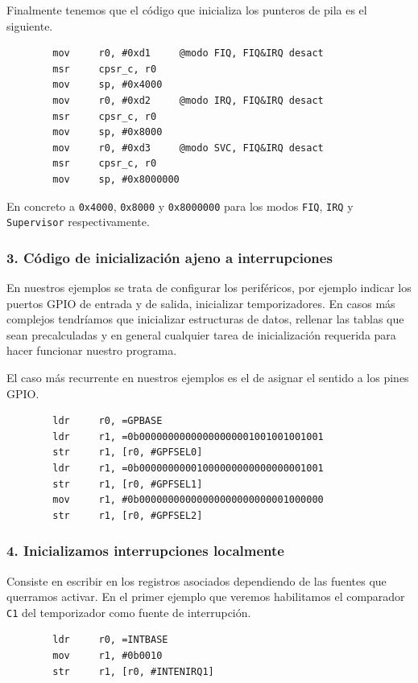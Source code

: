Finalmente tenemos que el código que inicializa los punteros de pila es el siguiente.

\begin{lstlisting}
        mov     r0, #0xd1     @modo FIQ, FIQ&IRQ desact
        msr     cpsr_c, r0
        mov     sp, #0x4000
        mov     r0, #0xd2     @modo IRQ, FIQ&IRQ desact
        msr     cpsr_c, r0
        mov     sp, #0x8000
        mov     r0, #0xd3     @modo SVC, FIQ&IRQ desact
        msr     cpsr_c, r0
        mov     sp, #0x8000000
\end{lstlisting}

En concreto a {\tt 0x4000}, {\tt 0x8000} y {\tt 0x8000000} para los modos {\tt FIQ}, {\tt IRQ} y
{\tt Supervisor} respectivamente.

\subsubsection{3. Código de inicialización ajeno a interrupciones}

En nuestros ejemplos se trata de configurar los periféricos, por ejemplo indicar los puertos
GPIO de entrada y de salida, inicializar temporizadores. En casos más complejos tendríamos que
inicializar estructuras de datos, rellenar las tablas que sean precalculadas y en general
cualquier tarea de inicialización requerida para hacer funcionar nuestro programa.

El caso más recurrente en nuestros ejemplos es el de asignar el sentido a los pines GPIO.

\begin{lstlisting}
        ldr     r0, =GPBASE
        ldr     r1, =0b00000000000000000001001001001001
        str     r1, [r0, #GPFSEL0]
        ldr     r1, =0b00000000001000000000000000001001
        str     r1, [r0, #GPFSEL1]
        mov     r1, #0b00000000000000000000000001000000
        str     r1, [r0, #GPFSEL2]
\end{lstlisting}

\subsubsection{4. Inicializamos interrupciones localmente}

Consiste en escribir en los registros asociados dependiendo de las fuentes que querramos
activar. En el primer ejemplo que veremos habilitamos el comparador
{\tt C1} del temporizador como fuente de interrupción.

\begin{lstlisting}
        ldr     r0, =INTBASE
        mov     r1, #0b0010
        str     r1, [r0, #INTENIRQ1]
\end{lstlisting}

